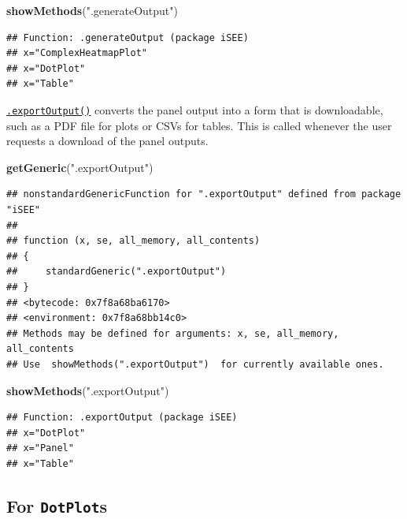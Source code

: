 \documentclass[
]{book}
\newenvironment{Shaded}{\begin{snugshade}}{\end{snugshade}}
\newcommand{\KeywordTok}[1]{\textcolor[rgb]{0.13,0.29,0.53}{\textbf{#1}}}
\newcommand{\NormalTok}[1]{#1}
\newcommand{\StringTok}[1]{\textcolor[rgb]{0.31,0.60,0.02}{#1}}
\begin{document}
\begin{Shaded}
\begin{Highlighting}[]
\KeywordTok{showMethods}\NormalTok{(}\StringTok{".generateOutput"}\NormalTok{)}
\end{Highlighting}
\end{Shaded}

\begin{verbatim}
## Function: .generateOutput (package iSEE)
## x="ComplexHeatmapPlot"
## x="DotPlot"
## x="Table"
\end{verbatim}

\href{https://isee.github.io/iSEE/reference/output-generics.html}{\texttt{.exportOutput()}} converts the panel output into a form that is downloadable, such as a PDF file for plots or CSVs for tables.
This is called whenever the user requests a download of the panel outputs.

\begin{Shaded}
\begin{Highlighting}[]
\KeywordTok{getGeneric}\NormalTok{(}\StringTok{".exportOutput"}\NormalTok{)}
\end{Highlighting}
\end{Shaded}

\begin{verbatim}
## nonstandardGenericFunction for ".exportOutput" defined from package "iSEE"
## 
## function (x, se, all_memory, all_contents) 
## {
##     standardGeneric(".exportOutput")
## }
## <bytecode: 0x7f8a68ba6170>
## <environment: 0x7f8a68bb14c0>
## Methods may be defined for arguments: x, se, all_memory, all_contents
## Use  showMethods(".exportOutput")  for currently available ones.
\end{verbatim}

\begin{Shaded}
\begin{Highlighting}[]
\KeywordTok{showMethods}\NormalTok{(}\StringTok{".exportOutput"}\NormalTok{)}
\end{Highlighting}
\end{Shaded}

\begin{verbatim}
## Function: .exportOutput (package iSEE)
## x="DotPlot"
## x="Panel"
## x="Table"
\end{verbatim}

\hypertarget{for-dotplots}{%
\subsection{\texorpdfstring{For \texttt{DotPlot}s}{For DotPlots}}\label{for-dotplots}}
\end{document}
